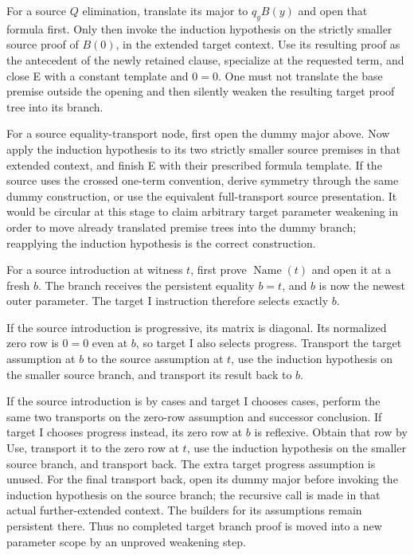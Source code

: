 For a source $Q$ elimination, translate its major to $q_yB(y)$ and open
that formula first.  Only then invoke the induction hypothesis on the
strictly smaller source proof of $B(0)$, in the extended target context.
Use its resulting proof as the antecedent of the newly retained clause,
specialize at the requested term, and close E with a constant template
and $0=0$.  One must not translate the base premise outside the opening
and then silently weaken the resulting target proof tree into its branch.

For a source equality-transport node, first open the dummy major above.
Now apply the induction hypothesis to its two strictly smaller source
premises in that extended context, and finish E with their prescribed
formula template.  If the source uses the crossed one-term convention,
derive symmetry through the same dummy construction, or use the equivalent
full-transport source presentation.  It would be circular at this stage
to claim arbitrary target parameter weakening in order to move already
translated premise trees into the dummy branch; reapplying the induction
hypothesis is the correct construction.

For a source introduction at witness $t$, first prove
$\operatorname{Name}(t)$ and open it at a fresh $b$.  The branch receives
the persistent equality $b=t$, and $b$ is now the newest outer parameter.
The target I instruction therefore selects exactly $b$.

If the source introduction is progressive, its matrix is diagonal.
Its normalized zero row is $0=0$ even at $b$, so target I also selects
progress.  Transport the target assumption at $b$ to the source
assumption at $t$, use the induction hypothesis on the smaller source
branch, and transport its result back to $b$.

If the source introduction is by cases and target I chooses cases,
perform the same two transports on the zero-row assumption and successor
conclusion.  If target I chooses progress instead, its zero row at $b$
is reflexive.  Obtain that row by Use, transport it to the zero row at
$t$, use the induction hypothesis on the smaller source branch, and
transport back.  The extra target progress assumption is unused.
For the final transport back, open its dummy major before invoking the
induction hypothesis on the source branch; the recursive call is made in
that actual further-extended context. The builders for its assumptions
remain persistent there. Thus no completed target branch proof is moved
into a new parameter scope by an unproved weakening step.

